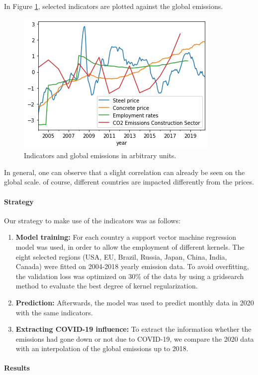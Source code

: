 In Figure \ref{fig:indicators}, selected indicators are plotted against the global \co emissions.
\begin{figure}[h!]
\centering
\includegraphics[width=0.4\linewidth]{../buildings/indicators}
\caption{Indicators and global \co emissions in arbitrary units.}
\label{fig:indicators}
\end{figure}
In general, one can observe that a slight correlation can already be seen on the global scale. of course, different countries are impacted differently from the prices. 

\paragraph{Strategy}

Our strategy to make use of the indicators was as follows:
\begin{enumerate}
	\item \textbf{Model training:} For each country a support vector machine regression model was used, in order to allow the employment of different kernels. The eight selected regions (USA, EU, Brazil, Russia, Japan, China, India, Canada)  were fitted on 2004-2018 yearly \co emission data. To avoid overfitting, the validation loss was optimized on 30\% of the data by using a gridsearch method to evaluate the best degree of kernel regularization. 
	\item \textbf{Prediction:} Afterwards, the model was used to predict monthly data in 2020 with the same indicators.
	\item \textbf{Extracting COVID-19 influence:} To extract the information whether the emissions had gone down or not due to COVID-19, we compare the 2020 data with an interpolation of the global emissions up to 2018.
\end{enumerate}

\paragraph{Results}

